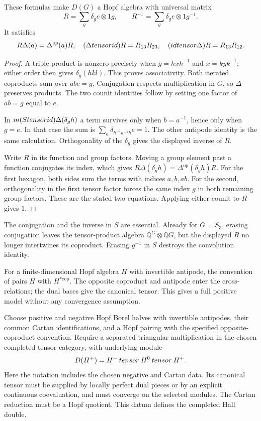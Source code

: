 \begin{theorem}
These formulas make $D(G)$ a Hopf algebra with universal matrix
\[
 R=\sum_g\delta_g e\otimes1g,
 \qquad R^{-1}=\sum_g\delta_g e\otimes1g^{-1}.
\]
It satisfies
\[
 R\Delta(a)=\Delta^{op}(a)R,\quad
 (\Delta tensorid)R=R_{13}R_{23},\quad
 (idtensor\Delta)R=R_{13}R_{12}.
\]
\end{theorem}
\begin{proof}
A triple product is nonzero precisely when
$g=hxh^{-1}$ and $x=kyk^{-1}$; either order then gives
$\delta_g(hkl)$. This proves associativity. Both iterated coproducts
sum over $abc=g$. Conjugation respects multiplication in $G$, so
$\Delta$ preserves products. The two counit identities follow by
setting one factor of $ab=g$ equal to $e$.

In $m(Stensorid)\Delta(\delta_gh)$ a term survives only when
$b=a^{-1}$, hence only when $g=e$. In that case the sum is
$\sum_a\delta_{h^{-1}a^{-1}h}e=1$. The other antipode identity is
the same calculation. Orthogonality of the $\delta_g$ gives the
displayed inverse of $R$.

Write $R$ in its function and group factors. Moving a group element
past a function conjugates its index, which gives
$R\Delta(\delta_gh)=\Delta^{\mathrm{op}}(\delta_gh)R$.
For the first hexagon, both sides sum the terms with indices $a,b,ab$.
For the second, orthogonality in the first tensor factor forces the
same index $g$ in both remaining group factors. These are the stated
two equations. Applying either counit to $R$ gives $1$.
\end{proof}

The conjugation and the inverse in $S$ are essential. Already for
$G=S_3$, erasing conjugation leaves the tensor-product algebra
$\mathbb Q^G\otimes\mathbb QG$, but the displayed $R$ no longer
intertwines its coproduct. Erasing $g^{-1}$ in $S$ destroys the
convolution identity.

For a finite-dimensional Hopf algebra $H$ with invertible antipode,
the convention of \cite[Section~7.14]{EGNOTensor} pairs $H$ with $H^{*\mathrm{cop}}$.
The opposite coproduct and antipode enter the cross-relations; the
dual bases give the canonical tensor. This gives a full positive model
without any convergence assumption.

\begin{definition}
Choose positive and negative Hopf Borel halves with invertible
antipodes, their common Cartan identifications, and a Hopf pairing with
the specified opposite-coproduct convention. Require a separated
triangular multiplication in the chosen completed tensor category,
with underlying module
\[
 D(H^+)=H^-\mathbin{tensor} H^0\mathbin{tensor} H^+.
\]
Here the notation includes the chosen negative and Cartan data. Its
canonical tensor must be supplied by locally perfect dual pieces or
by an explicit continuous coevaluation, and must converge on the
selected modules. The Cartan reduction must be a Hopf quotient.
This datum defines the completed Hall double.
\end{definition}


